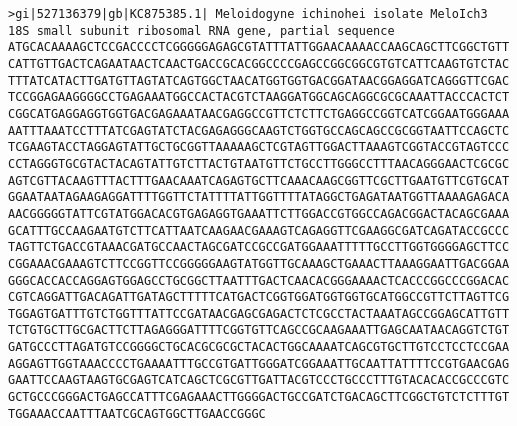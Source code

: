 \documentclass[11pt]{article}
\begin{document}
\begin{Verbatim}[commandchars=\\\{\}]
>gi|527136379|gb|KC875385.1| Meloidogyne ichinohei isolate MeloIch3 18S small subunit ribosomal RNA gene, partial sequence
ATGCACAAAAGCTCCGACCCCTCGGGGGAGAGCGTATTTATTGGAACAAAACCAAGCAGCTTCGGCTGTT
CATTGTTGACTCAGAATAACTCAACTGACCGCACGGCCCCGAGCCGGCGGCGTGTCATTCAAGTGTCTAC
TTTATCATACTTGATGTTAGTATCAGTGGCTAACATGGTGGTGACGGATAACGGAGGATCAGGGTTCGAC
TCCGGAGAAGGGGCCTGAGAAATGGCCACTACGTCTAAGGATGGCAGCAGGCGCGCAAATTACCCACTCT
CGGCATGAGGAGGTGGTGACGAGAAATAACGAGGCCGTTCTCTTCTGAGGCCGGTCATCGGAATGGGAAA
AATTTAAATCCTTTATCGAGTATCTACGAGAGGGCAAGTCTGGTGCCAGCAGCCGCGGTAATTCCAGCTC
TCGAAGTACCTAGGAGTATTGCTGCGGTTAAAAAGCTCGTAGTTGGACTTAAAGTCGGTACCGTAGTCCC
CCTAGGGTGCGTACTACAGTATTGTCTTACTGTAATGTTCTGCCTTGGGCCTTTAACAGGGAACTCGCGC
AGTCGTTACAAGTTTACTTTGAACAAATCAGAGTGCTTCAAACAAGCGGTTCGCTTGAATGTTCGTGCAT
GGAATAATAGAAGAGGATTTTGGTTCTATTTTATTGGTTTTATAGGCTGAGATAATGGTTAAAAGAGACA
AACGGGGGTATTCGTATGGACACGTGAGAGGTGAAATTCTTGGACCGTGGCCAGACGGACTACAGCGAAA
GCATTTGCCAAGAATGTCTTCATTAATCAAGAACGAAAGTCAGAGGTTCGAAGGCGATCAGATACCGCCC
TAGTTCTGACCGTAAACGATGCCAACTAGCGATCCGCCGATGGAAATTTTTGCCTTGGTGGGGAGCTTCC
CGGAAACGAAAGTCTTCCGGTTCCGGGGGAAGTATGGTTGCAAAGCTGAAACTTAAAGGAATTGACGGAA
GGGCACCACCAGGAGTGGAGCCTGCGGCTTAATTTGACTCAACACGGGAAAACTCACCCGGCCCGGACAC
CGTCAGGATTGACAGATTGATAGCTTTTTCATGACTCGGTGGATGGTGGTGCATGGCCGTTCTTAGTTCG
TGGAGTGATTTGTCTGGTTTATTCCGATAACGAGCGAGACTCTCGCCTACTAAATAGCCGGAGCATTGTT
TCTGTGCTTGCGACTTCTTAGAGGGATTTTCGGTGTTCAGCCGCAAGAAATTGAGCAATAACAGGTCTGT
GATGCCCTTAGATGTCCGGGGCTGCACGCGCGCTACACTGGCAAAATCAGCGTGCTTGTCCTCCTCCGAA
AGGAGTTGGTAAACCCCTGAAAATTTGCCGTGATTGGGATCGGAAATTGCAATTATTTTCCGTGAACGAG
GAATTCCAAGTAAGTGCGAGTCATCAGCTCGCGTTGATTACGTCCCTGCCCTTTGTACACACCGCCCGTC
GCTGCCCGGGACTGAGCCATTTCGAGAAACTTGGGGACTGCCGATCTGACAGCTTCGGCTGTCTCTTTGT
TGGAAACCAATTTAATCGCAGTGGCTTGAACCGGGC


\end{Verbatim}
\end{document}

